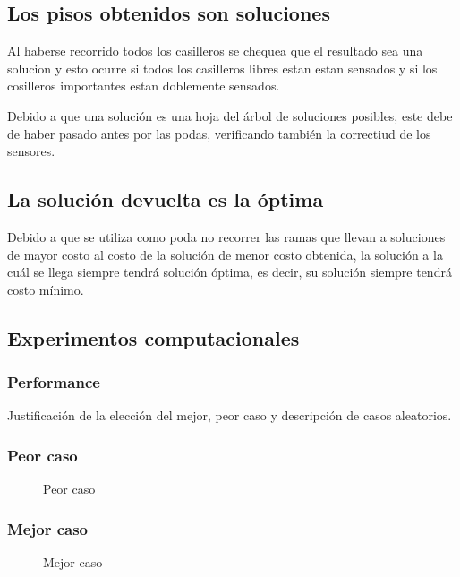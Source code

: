 \documentclass[a4paper, 10pt, twoside]{article}
\begin{document}
\subsection{Los pisos obtenidos son soluciones}
Al haberse recorrido todos los casilleros se chequea que el resultado sea una solucion y esto ocurre si todos los casilleros libres estan estan sensados y si los cosilleros importantes estan doblemente sensados.

Debido a que una solución es una hoja del árbol de soluciones posibles, este debe de haber pasado antes por las podas, verificando también la correctiud de los sensores.


\subsection{La solución devuelta es la óptima}
Debido a que se utiliza como poda no recorrer las ramas que llevan a soluciones de mayor costo al costo de la solución de menor costo obtenida, la solución a la cuál se llega siempre tendrá solución óptima, es decir, su solución siempre tendrá costo mínimo.


\subsection{Experimentos computacionales}

\subsubsection{Performance}
Justificación de la elección del mejor, peor caso y descripción de casos aleatorios.

\subsubsection{Peor caso}

\begin{figure}[H]
  \centering
  
  \caption{Peor caso}
\end{figure}


\subsubsection{Mejor caso}

\begin{figure}[H]
  \centering
  
  \caption{Mejor caso}
\end{figure}
\end{document}
